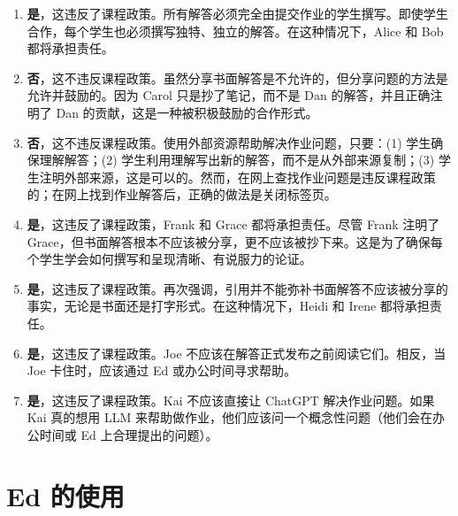 \documentclass[11pt,a4paper]{article}
\begin{document}
\begin{enumerate}[label=(\alph*)]
    \item \textbf{是}，这违反了课程政策。所有解答必须完全由提交作业的学生撰写。即使学生合作，每个学生也必须撰写独特、独立的解答。在这种情况下，Alice 和 Bob 都将承担责任。
    
    \item \textbf{否}，这不违反课程政策。虽然分享书面解答是不允许的，但分享问题的方法是允许并鼓励的。因为 Carol 只是抄了笔记，而不是 Dan 的解答，并且正确注明了 Dan 的贡献，这是一种被积极鼓励的合作形式。
    
    \item \textbf{否}，这不违反课程政策。使用外部资源帮助解决作业问题，只要：(1) 学生确保理解解答；(2) 学生利用理解写出新的解答，而不是从外部来源复制；(3) 学生注明外部来源，这是可以的。然而，在网上查找作业问题是违反课程政策的；在网上找到作业解答后，正确的做法是关闭标签页。
    
    \item \textbf{是}，这违反了课程政策，Frank 和 Grace 都将承担责任。尽管 Frank 注明了 Grace，但书面解答根本不应该被分享，更不应该被抄下来。这是为了确保每个学生学会如何撰写和呈现清晰、有说服力的论证。
    
    \item \textbf{是}，这违反了课程政策。再次强调，引用并不能弥补书面解答不应该被分享的事实，无论是书面还是打字形式。在这种情况下，Heidi 和 Irene 都将承担责任。
    
    \item \textbf{是}，这违反了课程政策。Joe 不应该在解答正式发布之前阅读它们。相反，当 Joe 卡住时，应该通过 Ed 或办公时间寻求帮助。
    
    \item \textbf{是}，这违反了课程政策。Kai 不应该直接让 ChatGPT 解决作业问题。如果 Kai 真的想用 LLM 来帮助做作业，他们应该问一个概念性问题（他们会在办公时间或 Ed 上合理提出的问题）。
\end{enumerate}

\section{Ed 的使用}
\end{document}
